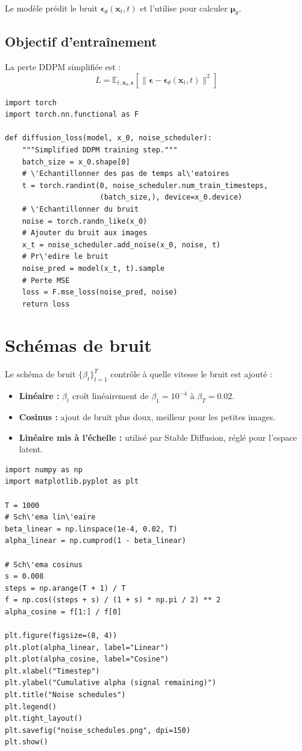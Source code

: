Le mod\`ele pr\'edit le bruit $\boldsymbol{\epsilon}_\theta(\mathbf{x}_t, t)$ et l'utilise pour calculer $\boldsymbol{\mu}_\theta$.

\subsection{Objectif d'entra\^inement}

La perte DDPM simplifi\'ee est :
\[
L = \mathbb{E}_{t, \mathbf{x}_0, \boldsymbol{\epsilon}} \left[\| \boldsymbol{\epsilon} - \boldsymbol{\epsilon}_\theta(\mathbf{x}_t, t) \|^2 \right]
\]

\begin{verbatim}
import torch
import torch.nn.functional as F

def diffusion_loss(model, x_0, noise_scheduler):
    """Simplified DDPM training step."""
    batch_size = x_0.shape[0]
    # \'Echantillonner des pas de temps al\'eatoires
    t = torch.randint(0, noise_scheduler.num_train_timesteps,
                      (batch_size,), device=x_0.device)
    # \'Echantillonner du bruit
    noise = torch.randn_like(x_0)
    # Ajouter du bruit aux images
    x_t = noise_scheduler.add_noise(x_0, noise, t)
    # Pr\'edire le bruit
    noise_pred = model(x_t, t).sample
    # Perte MSE
    loss = F.mse_loss(noise_pred, noise)
    return loss
\end{verbatim}

\section{Sch\'emas de bruit}

Le sch\'ema de bruit $\{\beta_t\}_{t=1}^T$ contr\^ole \`a quelle vitesse le bruit est ajout\'e :

\begin{itemize}
  \item \textbf{Lin\'eaire :} $\beta_t$ cro\^it lin\'eairement de $\beta_1 = 10^{-4}$ \`a $\beta_T = 0.02$.
  \item \textbf{Cosinus :} ajout de bruit plus doux, meilleur pour les petites images.
  \item \textbf{Lin\'eaire mis \`a l'\'echelle :} utilis\'e par Stable Diffusion, r\'egl\'e pour l'espace latent.
\end{itemize}

\begin{verbatim}
import numpy as np
import matplotlib.pyplot as plt

T = 1000
# Sch\'ema lin\'eaire
beta_linear = np.linspace(1e-4, 0.02, T)
alpha_linear = np.cumprod(1 - beta_linear)

# Sch\'ema cosinus
s = 0.008
steps = np.arange(T + 1) / T
f = np.cos((steps + s) / (1 + s) * np.pi / 2) ** 2
alpha_cosine = f[1:] / f[0]

plt.figure(figsize=(8, 4))
plt.plot(alpha_linear, label="Linear")
plt.plot(alpha_cosine, label="Cosine")
plt.xlabel("Timestep")
plt.ylabel("Cumulative alpha (signal remaining)")
plt.title("Noise schedules")
plt.legend()
plt.tight_layout()
plt.savefig("noise_schedules.png", dpi=150)
plt.show()
\end{verbatim}

